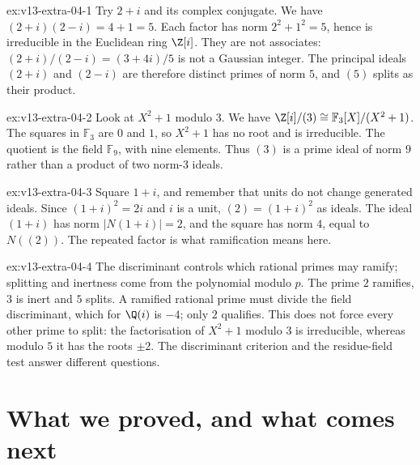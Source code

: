 \begin{solution}{ex:v13-extra-04-1}
\idea Try $2+i$ and its complex conjugate.
\writeup We have $(2+i)(2-i)=4+1=5$. Each factor has norm $2^2+1^2=5$, hence is irreducible in the Euclidean ring $\Z[i]$. They are not associates: $(2+i)/(2-i)=(3+4i)/5$ is not a Gaussian integer. The principal ideals $(2+i)$ and $(2-i)$ are therefore distinct primes of norm $5$, and $(5)$ splits as their product.
\end{solution}

\begin{solution}{ex:v13-extra-04-2}
\idea Look at $X^2+1$ modulo $3$.
\writeup We have $\Z[i]/(3)\cong\mathbb F_3[X]/(X^2+1)$. The squares in $\mathbb F_3$ are $0$ and $1$, so $X^2+1$ has no root and is irreducible. The quotient is the field $\mathbb F_9$, with nine elements. Thus $(3)$ is a prime ideal of norm $9$ rather than a product of two norm-$3$ ideals.
\end{solution}

\begin{solution}{ex:v13-extra-04-3}
\idea Square $1+i$, and remember that units do not change generated ideals.
\writeup Since $(1+i)^2=2i$ and $i$ is a unit, $(2)=(1+i)^2$ as ideals. The ideal $(1+i)$ has norm $|N(1+i)|=2$, and the square has norm $4$, equal to $N((2))$. The repeated factor is what ramification means here.
\end{solution}

\begin{solution}{ex:v13-extra-04-4}
\idea The discriminant controls which rational primes may ramify; splitting and inertness come from the polynomial modulo $p$.
\writeup The prime $2$ ramifies, $3$ is inert and $5$ splits. A ramified rational prime must divide the field discriminant, which for $\Q(i)$ is $-4$; only $2$ qualifies. This does not force every other prime to split: the factorisation of $X^2+1$ modulo $3$ is irreducible, whereas modulo $5$ it has the roots $\pm2$. The discriminant criterion and the residue-field test answer different questions.
\end{solution}

\section{What we proved, and what comes next}

